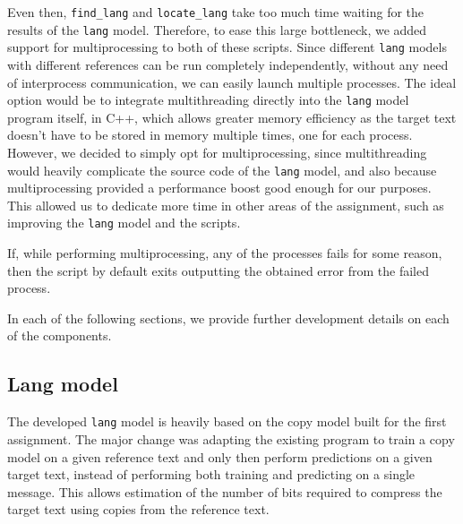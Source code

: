 \documentclass{article}
\begin{document}
Even then, \texttt{find\_lang} and \texttt{locate\_lang} take too much time waiting for the results of the \texttt{lang} model.
Therefore, to ease this large bottleneck, we added support for multiprocessing to both of these scripts.
Since different \texttt{lang} models with different references can be run completely independently, without any need of interprocess communication, we can easily launch multiple processes.
The ideal option would be to integrate multithreading directly into the \texttt{lang} model program itself, in C++, which allows greater memory efficiency as the target text doesn't have to be stored in memory multiple times, one for each process.
However, we decided to simply opt for multiprocessing, since multithreading would heavily complicate the source code of the \texttt{lang} model, and also because multiprocessing provided a performance boost good enough for our purposes.
This allowed us to dedicate more time in other areas of the assignment, such as improving the \texttt{lang} model and the scripts.

If, while performing multiprocessing, any of the processes fails for some reason, then the script by default exits outputting the obtained error from the failed process.

In each of the following sections, we provide further development details on each of the components.

\subsection{Lang model}
\label{subsec:methodology_lang_model}

The developed \texttt{lang} model is heavily based on the copy model built for the first assignment.
The major change was adapting the existing program to train a copy model on a given reference text and only then perform predictions on a given target text, instead of performing both training and predicting on a single message.
This allows estimation of the number of bits required to compress the target text using copies from the reference text.
\end{document}
